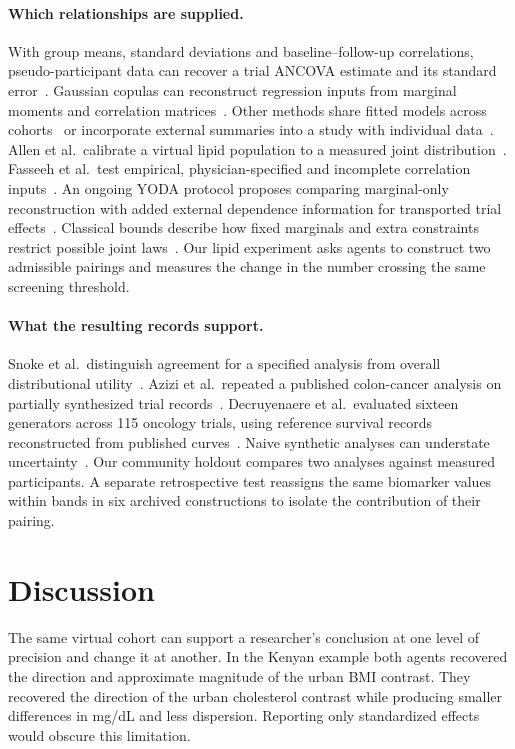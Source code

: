 \documentclass[sigconf,anonymous,review]{acmart}
\begin{document}
\paragraph{Which relationships are supplied.}
With group means, standard deviations and baseline--follow-up correlations, pseudo-participant data can recover a trial ANCOVA estimate and its standard error~\cite{pseudoancova}. Gaussian copulas can reconstruct regression inputs from marginal moments and correlation matrices~\cite{bonofiglio}. Other methods share fitted models across cohorts~\cite{filshtein} or incorporate external summaries into a study with individual data~\cite{syndi}. Allen et al.\ calibrate a virtual lipid population to a measured joint distribution~\cite{allenlipid}. Fasseeh et al.\ test empirical, physician-specified and incomplete correlation inputs~\cite{fasseeh}. An ongoing YODA protocol proposes comparing marginal-only reconstruction with added external dependence information for transported trial effects~\cite{yodaprotocol}. Classical bounds describe how fixed marginals and extra constraints restrict possible joint laws~\cite{bounds,makarov,zaev}. Our lipid experiment asks agents to construct two admissible pairings and measures the change in the number crossing the same screening threshold.

\paragraph{What the resulting records support.}
Snoke et al.\ distinguish agreement for a specified analysis from overall distributional utility~\cite{specificutility}. Azizi et al.\ repeated a published colon-cancer analysis on partially synthesized trial records~\cite{azizi}. Decruyenaere et al.\ evaluated sixteen generators across 115 oncology trials, using reference survival records reconstructed from published curves~\cite{oncology115}. Naive synthetic analyses can understate uncertainty~\cite{inferential,oncology115}. Our community holdout compares two analyses against measured participants. A separate retrospective test reassigns the same biomarker values within bands in six archived constructions to isolate the contribution of their pairing.

\section{Discussion}
The same virtual cohort can support a researcher's conclusion at one level of precision and change it at another. In the Kenyan example both agents recovered the direction and approximate magnitude of the urban BMI contrast. They recovered the direction of the urban cholesterol contrast while producing smaller differences in mg/dL and less dispersion. Reporting only standardized effects would obscure this limitation.
\end{document}
